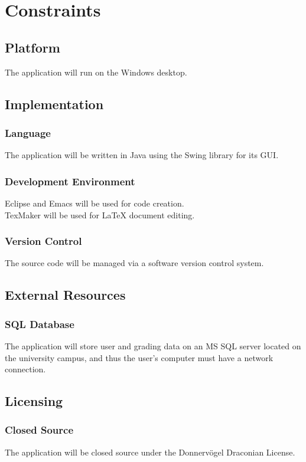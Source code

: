 \documentclass{article}
\begin{document}
\section{Constraints}
\subsection{Platform}
The application will run on the Windows desktop.
\subsection{Implementation}
\subsubsection{Language}
The application will be written in Java using the Swing library for its GUI.
\subsubsection{Development Environment}
Eclipse and Emacs will be used for code creation.\\
TexMaker will be used for {\LaTeX} document editing.
\subsubsection{Version Control}
The source code will be managed via a software version control system.
\subsection{External Resources}
\subsubsection{SQL Database}
The application will store user and grading data on an MS SQL server located on
the university campus, and thus the user's computer must have a network connection.
\subsection{Licensing}
\subsubsection{Closed Source}
The application will be closed source under the Donnervögel Draconian License.
\end{document}
